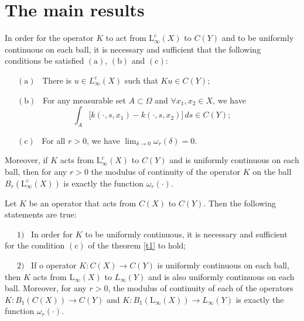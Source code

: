 \documentclass[12pt]{llncs}
\begin{document}
\section{The main results}

\begin{theorem} \label{t1} In order for the operator $K$ to act from $\mathrm{L}_\infty^c(X)$ to $C(Y)$ and to be uniformly continuous on each ball, it is necessary and sufficient that the following conditions be satisfied $\mathrm{(a)}$, $\mathrm{(b)}$ and $\mathrm{(c)}$: \smallskip

\ \ \   $\mathrm{(a)}$ \ There is $u\in L_\infty^c(X)$ such that $Ku\in C(Y)$; 

 \ \ \  $\mathrm{(b)}$ \  For any measurable set $A\subset \Omega$ and $\forall x_1,x_2\in X$, we have $$\displaystyle \int_A \bigl[k(\cdot,s,x_1)-k(\cdot,s,x_2)\bigr]\,ds\in C(Y);$$

 \ \ \  $\mathrm{(c)}$ \  For all $r>0$, we have $\displaystyle \lim_{\delta\to 0}\omega_r(\delta)=0$. \smallskip

 Moreover, if $K$ acts from $\mathrm{L}_\infty^c(X)$ to $C(Y)$ and is uniformly continuous on each ball, then for any $r>0$ the modulus of continuity of the operator $K$ on the ball $B_r(\mathrm{L}_\infty^c(X))$ is exactly the function $\omega_r(\cdot)$.
\end{theorem}

\begin{theorem} \label{t2} Let $K$ be an operator that acts from $C(X)$ to $C(Y)$. Then the following statements are true:\smallskip 

\ \ \  $\mathrm{1)}$ \  In order for $K$ to be uniformly continuous, it is necessary and sufficient for the condition $\mathrm{(c)}$ of the theorem \ref{t1} to hold; \smallskip

\ \ \  $\mathrm{2)}$ \ If o operator $K: C(X) \to C(Y)$ is uniformly continuous on each ball, then $K$ acts from  $\mathrm{L}_\infty(X)$ to $L_\infty(Y)$ and is also uniformly continuous on each ball. Moreover, for any $r>0$, the modulus of continuity of each of the operators $K:B_1(C(X))\to C(Y)$ and $K:B_1(\mathrm{L}_\infty(X))\to L_\infty(Y)$ is exactly the function $\omega_r(\cdot)$.
\end{theorem}
\end{document}
